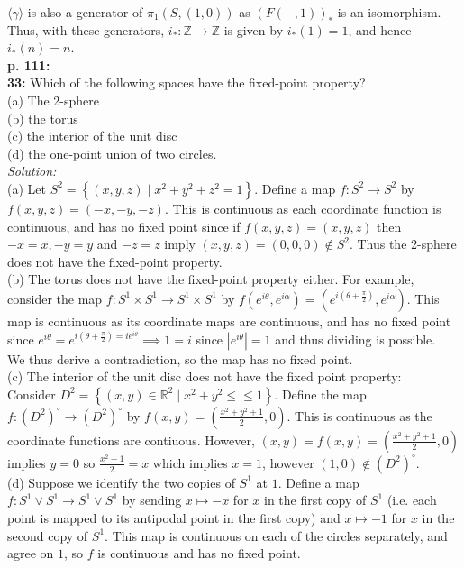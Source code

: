 \documentclass[a4paper]{article}
\begin{document}
   $\langle \gamma \rangle $ is also a generator of
   $\pi_1 (S, (1,0))$ as $\left( F(-,1) \right)_*$ is an isomorphism. Thus,
   with these generators,
   $i_*  \colon \mathbb{Z} \to \mathbb{Z}$
 is given by $i_*(1) = 1$, and hence $i_*(n) = n$.\\
 \linebreak
 \textbf{p. 111:}\\
 \textbf{33:} Which of the following spaces have the fixed-point property?\\
 (a) The 2-sphere\\
 (b) the torus\\
 (c) the interior of the unit disc\\
 (d) the one-point union of two circles.\\
 \linebreak
 \textit{Solution:}\\
 (a) Let $S^{2} = 
 \left\{ (x,y,z)  \mid x^2 + y^2 + z^2 = 1 \right\} $. Define a map
 $f  \colon S^{2} \to S^{2}$ by
 $f(x,y,z) = \left( -x,-y,-z \right) $. This is continuous as each coordinate
 function is continuous, and has no fixed point since if
 $f(x,y,z)=(x,y,z)$ then $-x = x, -y=y$ and $-z = z$ imply $(x,y,z)=(0,0,0)
 \not\in S^{2}$. Thus the 2-sphere does not have the fixed-point property.\\
  \linebreak
  (b) The torus does not have the fixed-point property either. For example,
  consider the map
  $f  \colon S^{1} \times S^{1} \to S^{1} \times S^{1}$ by
  $f(e^{i \theta}, e^{i \alpha}) =
  \left( e^{i (\theta + \frac{\pi}{2})},
  e^{i \alpha} \right) $. This map is continuous as its coordinate maps are
  continuous, and has no fixed point since
  $e^{i \theta}= e^{i \left( \theta + \frac{\pi}{2} \right) 
  =i e^{i \theta}} \implies
  1 = i$ since $\left| e^{i \theta} \right| =1$ and thus dividing is
    possible.\\
    We thus derive a contradiction, so the map has no fixed point.\\
    \linebreak
    (c) The interior of the unit disc does not have the fixed point property:\\
    Consider  $D^2 = \left\{ (x,y) \in \mathbb{R}^2  \mid 
    x^2 + y^2 \le \le 1\right\} $. 
    Define the map 
    $f \colon \left( D^2 \right)^{\circ}
    \to \left( D^2 \right)^{\circ}$ by
    $f(x,y) = \left( \frac{x^2 + y^2 +1}{2},0 \right) $. This is continuous as
    the coordinate functions are contiuous. However,
    $(x,y) = f(x,y) = \left( \frac{x^2 + y^2 +1}{2},0 \right) $ implies
    $y = 0$ so $\frac{x^2 + 1}{2}= x$ which implies $x=1$, however
    $(1,0) \not\in \left( D^2 \right)^{\circ}$.\\
    \linebreak
    (d) Suppose we identify the two copies of $S^{1}$ at $1$. Define a map
    $f  \colon S^{1} \vee S^{1} \to S^{1} \vee S^{1}$ by
    sending $x \mapsto -x$ for $x$ in the first copy of $S^{1}$ (i.e. each
    point is mapped to its antipodal point in the first copy) and
    $x \mapsto -1$ for $x$ in the second copy of $S^{1}$. This map is
    continuous on each of the circles separately, and agree on $1$, so 
    $f$ is continuous and has no fixed point.
    
\end{document}
